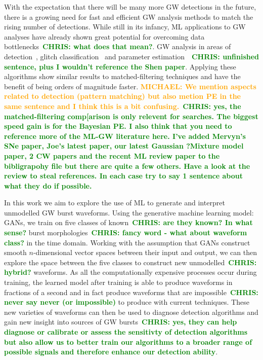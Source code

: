\documentclass[12pt]{iopart}
\newcommand{\chris}[1]{\textbf{\textcolor{green}{CHRIS: #1}}}
\newcommand{\michael}[1]{\textbf{\textcolor{orange}{MICHAEL: #1}}}
\begin{document}
%
With the expectation that there will be many more \ac{GW} detections in the
future, there is a growing need for fast and efficient \ac{GW} analysis methods
to match the rising number of detections. While still in its infancy, \ac{ML}
applications to \ac{GW} analyses have already shown great potential for
overcoming data bottlenecks~\chris{what does that mean?}. \ac{GW} analysis in
areas of detection~\cite{Gabbard2017,Gebhard_2019,Krastev_2020}, glitch
classification~\cite{Bahaadini, George_2018,Razzano_2018} and parameter
estimation~\cite{gabbard2019bayesian, shen2019deterministic,
green2020gravitationalwave}~\chris{unfinished sentence, plus I wouldn't
reference the Shen paper}. Applying these algorithms show similar results to
matched-filtering techniques and have the benefit of being orders of magnitude
faster. \michael{We mention aspects related to detection (pattern matching) but
also metion PE in the same sentence and I think this is a bit
confusing.}~\chris{yes, the matched-filtering comp[arison is only relevent for
searches. The biggest speed gain is for the Bayesian PE. I also think that you
need to reference more of the ML-GW literature here. I've added Mervyn's SNe
paper, Joe's latest paper, our latest Gaussian ?Mixture model paper, 2 CW
papers and the recent ML review paper to the bibligrapohy file but there are
quite a few others. Have a look at the review to steal references. In each case
try to say 1 sentence about what they do if possible.}

%
In this work we aim to explore the use of \ac{ML} to generate and interpret
unmodelled \ac{GW} burst waveforms. Using the generative machine learning
model: \acp{GAN}, we train on five classes of known~\chris{are they known? In
what sense?} burst morphologies~\chris{fancy word - what about waveform class?}
in the time domain. Working with the assumption that \acp{GAN} construct smooth
$n$-dimensional vector spaces between their input and output, we can then
explore the space between the five classes to construct new
unmodelled~\chris{hybrid?} waveforms. As all the computationally expensive
processes occur during training, the learned model after training is able to
produce waveforms in fractions of a second and in fact produce waveforms that
are impossible~\chris{never say never (or impossible)} to produce with current
techniques. These new varieties of waveforms can then be used to diagnose
detection algorithms and gain new insight into sources of \ac{GW}
bursts~\chris{yes, they can help diagnose or calibrate or assess the sensitivty
of detection algorithms but also allow us to better train our algorithms to a
broader range of possible signals and therefore enhance our detection ability}. 
\end{document}
